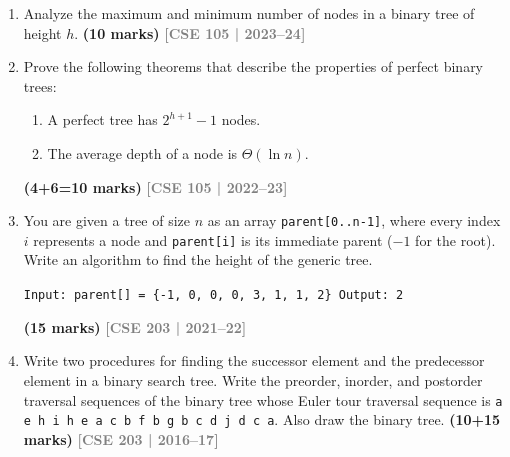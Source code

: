 \documentclass[12pt,a3paper]{article}
\newcommand{\yr}[1]{\hfill\textcolor{gray}{\small\textbf{[#1]}}}
\newcommand{\mk}[1]{\textcolor{orange!70!black}{\small\textbf{(#1 marks)}}}
\begin{document}
\begin{enumerate}
\item Analyze the maximum and minimum number of nodes in a binary tree of height $h$. \mk{10}
\yr{CSE 105 | 2023--24}


\item Prove the following theorems that describe the properties of perfect binary trees:
\begin{enumerate}
  \item A perfect tree has $2^{h+1} - 1$ nodes.
  \item The average depth of a node is $\Theta(\ln n)$.
\end{enumerate}
\mk{4+6=10}
\yr{CSE 105 | 2022--23}

\item You are given a tree of size $n$ as an array \texttt{parent[0..n-1]}, where every index $i$ represents a node and \texttt{parent[i]} is its immediate parent ($-1$ for the root). Write an algorithm to find the height of the generic tree.
\begin{center}
\texttt{Input: parent[] = \{-1, 0, 0, 0, 3, 1, 1, 2\} \quad Output: 2}
\end{center}
\mk{15}
\yr{CSE 203 | 2021--22}

\item Write two procedures for finding the successor element and the predecessor element in a binary search tree. Write the preorder, inorder, and postorder traversal sequences of the binary tree whose Euler tour traversal sequence is \texttt{a e h i h e a c b f b g b c d j d c a}. Also draw the binary tree. \mk{10+15}
\yr{CSE 203 | 2016--17}


\end{enumerate}
\end{document}
